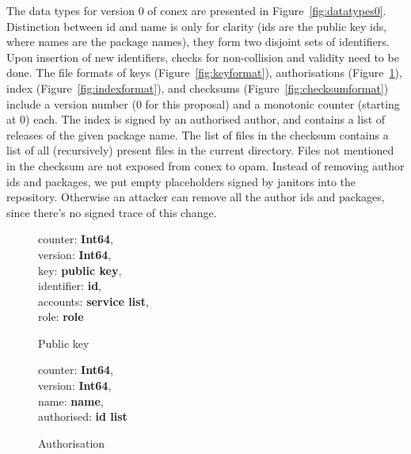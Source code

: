 \documentclass[nocopyrightspace]{sigplanconf}
\begin{document}
The data types for version 0 of conex are presented in Figure~\ref{fig:datatypes0}.
Distinction between id and name is only for clarity (ids are the public key ids, where names are the package names), they form two disjoint sets of identifiers.
Upon insertion of new identifiers, checks for non-collision and validity need to be done.
The file formats of keys (Figure~\ref{fig:keyformat}), authorisations (Figure~\ref{fig:authformat}), index (Figure~\ref{fig:indexformat}), and checksums (Figure~\ref{fig:checksumformat}) include a version number (0 for this proposal) and a monotonic counter (starting at 0) each.
The index is signed by an authorised author, and contains a list of releases of the given package name.
The list of files in the checksum contains a list of all (recursively) present files in the current directory.
Files not mentioned in the checksum are not exposed from conex to opam.
Instead of removing author ids and packages, we put empty placeholders signed by janitors into the repository.
Otherwise an attacker can remove all the author ids and packages, since there's no signed trace of this change.

\begin{figure}
  \centering
  \begin{minipage}{\hsize}
    \begin{minipage}{.4 \hsize}
counter: \textbf{Int64},\\
version: \textbf{Int64},\\
key: \textbf{public key},\\
identifier: \textbf{id},\\
accounts: \textbf{service list},\\
role: \textbf{role}
 \caption{\label{fig:keyformat} Public key}
    \end{minipage}
    \begin{minipage}{.4 \hsize}
counter: \textbf{Int64},\\
version: \textbf{Int64},\\
name: \textbf{name},\\
authorised: \textbf{id list}
 \caption{\label{fig:authformat} Authorisation}
    \end{minipage}
  \end{minipage}
\end{figure}
\end{document}
